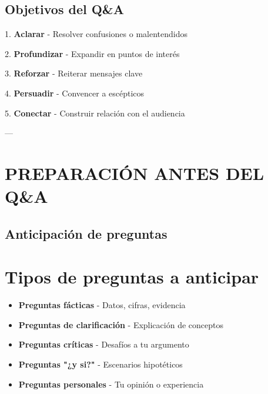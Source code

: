 \documentclass[a4paper,11pt]{article}
\begin{document}
\vspace{0.2cm}

\subsection{Objetivos del Q&A}

1. \textbf{Aclarar} - Resolver confusiones o malentendidos

2. \textbf{Profundizar} - Expandir en puntos de interés

3. \textbf{Reforzar} - Reiterar mensajes clave

4. \textbf{Persuadir} - Convencer a escépticos

5. \textbf{Conectar} - Construir relación con el audiencia

\vspace{0.2cm}

---

\vspace{0.2cm}

\section{PREPARACIÓN ANTES DEL Q&A}

\vspace{0.2cm}

\subsection{Anticipación de preguntas}

\vspace{0.2cm}

\section{Tipos de preguntas a anticipar}

\begin{itemize}

  \item \textbf{Preguntas fácticas} - Datos, cifras, evidencia

  \item \textbf{Preguntas de clarificación} - Explicación de conceptos

  \item \textbf{Preguntas críticas} - Desafíos a tu argumento

  \item \textbf{Preguntas "¿y si?"} - Escenarios hipotéticos

  \item \textbf{Preguntas personales} - Tu opinión o experiencia

\end{itemize}
\end{document}

